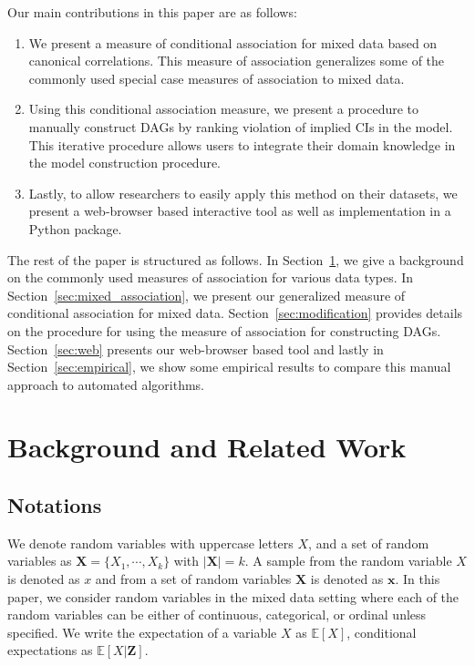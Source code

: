 \documentclass{uai2025} %
\begin{document}
Our main contributions in this paper are as follows:
\begin{enumerate}
	\item We present a measure of conditional association for mixed data
		based on canonical correlations. This measure of association
		generalizes some of the commonly used special case measures of 
		association to mixed data.
	\item Using this conditional association measure, we present a procedure to
		manually construct DAGs by ranking violation of implied CIs in the 
		model. This iterative procedure allows users to integrate their
		domain knowledge in the model construction procedure.
	\item Lastly, to allow researchers to easily apply this method on their
		datasets, we present a web-browser based interactive tool as well
		as implementation in a Python package.
\end{enumerate}

The rest of the paper is structured as follows. In
Section~\ref{sec:background}, we give a background on the commonly used
measures of association for various data types. In
Section~\ref{sec:mixed_association}, we present our generalized measure of
conditional association for mixed data. Section~\ref{sec:modification} provides
details on the procedure for using the measure of association for constructing
DAGs. Section~\ref{sec:web} presents our web-browser based tool and lastly in
Section~\ref{sec:empirical}, we show some empirical results to compare this
manual approach to automated algorithms.

\section{Background and Related Work}
\label{sec:background}
\subsection{Notations}
We denote random variables with uppercase letters $ X $, and a set of random
variables as $ \bm{X} = \{X_1, \cdots, X_k\} $ with $ \rvert \bm{X} \rvert = k
$. A sample from the random variable $ X $ is denoted as $ x $ and from a set
of random variables $ \bm{X} $ is denoted as $ \bm{x} $. In this paper, we
consider random variables in the mixed data setting where each of the random
variables can be either of continuous, categorical, or ordinal unless
specified. We write the expectation of a variable $ X $ as $ \mathbb{E}[X] $, conditional
expectations as $ \mathbb{E}[X | \bm{Z}] $.
\end{document}
